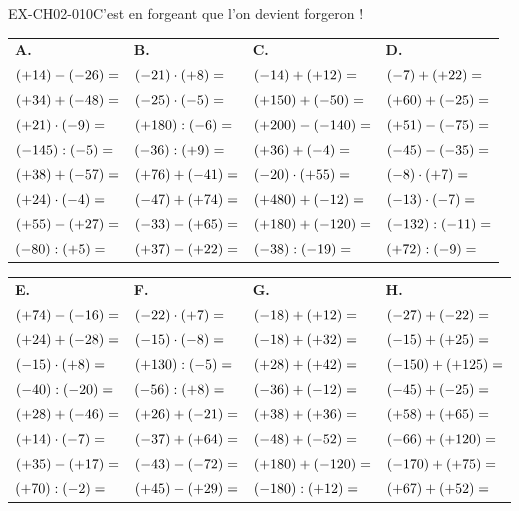 \begin{exercice}{EX-CH02-010}{C’est en forgeant que l’on devient forgeron !}

{\small
\bigskip
\def\arraystretch{1.25}
\begin{tabularx}{\linewidth}{*{4}{X}}
\textbf{A.} & \textbf{B.} & \textbf{C.} & \textbf{D.} \\
$(+14)-(-26)= \dotfill$ & $(-21)\cdot(+8)= \dotfill$ & $(-14)+(+12)= \dotfill$ & $(-7)+(+22)= \dotfill$ \\
$(+34)+(-48)= \dotfill$ & $(-25)\cdot(-5)= \dotfill$ & $(+150)+(-50)= \dotfill$ & $(+60)+(-25)= \dotfill$ \\
$(+21)\cdot(-9)= \dotfill$ & $(+180):(-6)= \dotfill$ & $(+200)-(-140)= \dotfill$ & $(+51)-(-75)= \dotfill$ \\
$(-145):(-5)= \dotfill$ & $(-36):(+9)= \dotfill$ & $(+36)+(-4)= \dotfill$ & $(-45)-(-35)= \dotfill$ \\
$(+38)+(-57)= \dotfill$ & $(+76)+(-41)= \dotfill$ & $(-20)\cdot(+55)= \dotfill$ & $(-8)\cdot(+7)= \dotfill$ \\
$(+24)\cdot(-4)= \dotfill$ & $(-47)+(+74)= \dotfill$ & $(+480)+(-12)= \dotfill$ & $(-13)\cdot(-7)= \dotfill$ \\
$(+55)-(+27)= \dotfill$ & $(-33)-(+65)= \dotfill$ & $(+180)+(-120)= \dotfill$ & $(-132):(-11)= \dotfill$ \\
$(-80):(+5)= \dotfill$ & $(+37)-(+22)= \dotfill$ & $(-38):(-19)= \dotfill$ & $(+72):(-9)= \dotfill$ \\
\end{tabularx}

\bigskip
\begin{tabularx}{\linewidth}{*{4}{X}}
\textbf{E.} & \textbf{F.} & \textbf{G.} & \textbf{H.} \\
$(+74)-(-16)= \dotfill$ & $(-22)\cdot(+7)= \dotfill$ & $(-18)+(+12)= \dotfill$ & $(-27)+(-22)= \dotfill$ \\
$(+24)+(-28)= \dotfill$ & $(-15)\cdot(-8)= \dotfill$ & $(-18)+(+32)= \dotfill$ & $(-15)+(+25)= \dotfill$ \\
$(-15)\cdot(+8)= \dotfill$ & $(+130):(-5)= \dotfill$ & $(+28)+(+42)= \dotfill$ & $(-150)+(+125)= \dotfill$ \\
$(-40):(-20)= \dotfill$ & $(-56):(+8)= \dotfill$ & $(-36)+(-12)= \dotfill$ & $(-45)+(-25)= \dotfill$ \\
$(+28)+(-46)= \dotfill$ & $(+26)+(-21)= \dotfill$ & $(+38)+(+36)= \dotfill$ & $(+58)+(+65)= \dotfill$ \\
$(+14)\cdot(-7)= \dotfill$ & $(-37)+(+64)= \dotfill$ & $(-48)+(-52)= \dotfill$ & $(-66)+(+120)= \dotfill$ \\
$(+35)-(+17)= \dotfill$ & $(-43)-(-72)= \dotfill$ & $(+180)+(-120)= \dotfill$ & $(-170)+(+75)= \dotfill$ \\
$(+70):(-2)= \dotfill$ & $(+45)-(+29)= \dotfill$ & $(-180):(+12)= \dotfill$ & $(+67)+(+52)= \dotfill$ \\
\end{tabularx}

}
\end{exercice}
